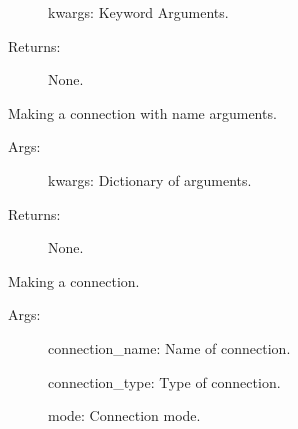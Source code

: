 \documentclass[letterpaper,10pt,english]{sphinxmanual}
\begin{document}
\begin{fulllineitems}
\begin{fulllineitems}
\begin{description}
\sphinxAtStartPar
kwargs:   Keyword Arguments.

\item[{Returns:}] \leavevmode
\sphinxAtStartPar
None.

\end{description}

\end{fulllineitems}


\begin{fulllineitems}
\label{\detokenize{QConnectBase:QConnectBase.connection_manager.ConnectionManager.connect_named_args}}
\sphinxAtStartPar
Making a connection with name arguments.
\begin{description}
\item[{Args:}] \leavevmode
\sphinxAtStartPar
kwargs: Dictionary of arguments.

\item[{Returns:}] \leavevmode
\sphinxAtStartPar
None.

\end{description}

\end{fulllineitems}


\begin{fulllineitems}
\label{\detokenize{QConnectBase:QConnectBase.connection_manager.ConnectionManager.connect_unnamed_args}}
\sphinxAtStartPar
Making a connection.
\begin{description}
\item[{Args:}] \leavevmode
\sphinxAtStartPar
connection\_name: Name of connection.

\sphinxAtStartPar
connection\_type: Type of connection.

\sphinxAtStartPar
mode: Connection mode.


\end{description}
\end{fulllineitems}
\end{fulllineitems}
\end{document}
